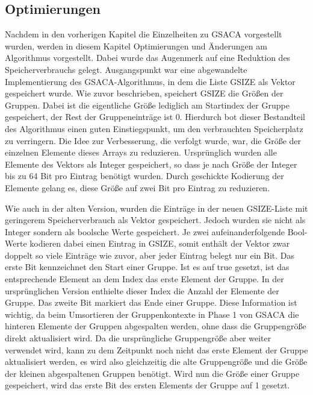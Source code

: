 \newpage
\subsection{Optimierungen}
\label{gsaca:chapter7}
Nachdem in den vorherigen Kapitel die Einzelheiten zu GSACA vorgestellt wurden, werden in diesem Kapitel Optimierungen und Änderungen am Algorithmus vorgestellt.
Dabei wurde das Augenmerk auf eine Reduktion des Speicherverbrauchs gelegt.
Ausgangspunkt war eine abgewandelte Implementierung des GSACA-Algorithmus, in dem die Liste GSIZE als Vektor gespeichert wurde.
Wie zuvor beschrieben, speichert GSIZE die Größen der Gruppen.
Dabei ist die eigentliche Größe lediglich am Startindex der Gruppe gespeichert, der Rest der Gruppeneinträge ist 0.
Hierdurch bot dieser Bestandteil des Algorithmus einen guten Einstiegspunkt, um den verbrauchten Speicherplatz zu verringern.
Die Idee zur Verbesserung, die verfolgt wurde, war, die Größe der einzelnen Elemente dieses Arrays zu reduzieren.
Ursprünglich wurden alle Elemente des Vektors als Integer gespeichert, so dass je nach Größe der Integer bis zu 64 Bit pro Eintrag benötigt wurden.
Durch geschickte Kodierung der Elemente gelang es, diese Größe auf zwei Bit pro Eintrag zu reduzieren. \par
Wie auch in der alten Version, wurden die Einträge in der neuen GSIZE-Liste mit geringerem Speicherverbrauch als Vektor gespeichert.
Jedoch wurden sie nicht als Integer sondern als boolsche Werte gespeichert.
Je zwei aufeinanderfolgende Bool-Werte kodieren dabei einen Eintrag in GSIZE, somit enthält der Vektor zwar doppelt so viele Einträge wie zuvor, aber jeder Eintrag belegt nur ein Bit.
Das erste Bit kennzeichnet den Start einer Gruppe.
Ist es auf true gesetzt, ist das entsprechende Element an dem Index das erste Element der Gruppe.
In der ursprünglichen Version enthielte dieser Index die Anzahl der Elemente der Gruppe.
Das zweite Bit markiert das Ende einer Gruppe.
Diese Information ist wichtig, da beim Umsortieren der Gruppenkontexte in Phase 1 von GSACA die hinteren Elemente der Gruppen abgespalten werden, ohne dass die Gruppengröße direkt aktualisiert wird.
Da die ursprüngliche Gruppengröße aber weiter verwendet wird, kann zu dem Zeitpunkt noch nicht das erste Element der Gruppe aktualisiert werden, es wird also gleichzeitig die alte Gruppengröße und die Größe der kleinen abgespaltenen Gruppen benötigt.
Wird nun die Größe einer Gruppe gespeichert, wird das erste Bit des ersten Elements der Gruppe auf 1 gesetzt.

